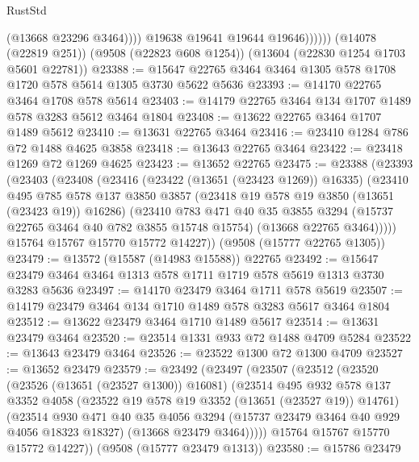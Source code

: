 \begin{lexlean}{RustStd}
\begin{coremodule}
                      (@13668 @23296 @3464))))
                @19638
                @19641
                @19644
                @19646))))))
    (@14078 (@22819 @251))
    (@9508 (@22823 @608 @1254))
    (@13604 (@22830 @1254 @1703 @5601 @22781))
@23388 := @15647 @22765 @3464 @3464 @1305 @578 @1708 @1720 @578 @5614 @1305 @3730 @5622 @5636
@23393 := @14170 @22765 @3464 @1708 @578 @5614
@23403 := @14179 @22765 @3464 @134 @1707 @1489 @578 @3283 @5612 @3464 @1804
@23408 := @13622 @22765 @3464 @1707 @1489 @5612
@23410 := @13631 @22765 @3464
@23416 := @23410 @1284 @786 @72 @1488 @4625 @3858
@23418 := @13643 @22765 @3464
@23422 := @23418 @1269 @72 @1269 @4625
@23423 := @13652 @22765
@23475 := @23388
    (@23393
      (@23403
        (@23408
          (@23416
            (@23422 (@13651 (@23423 @1269)) @16335)
            (@23410
              @495
              @785
              @578
              @137
              @3850
              @3857
              (@23418 @19 @578 @19 @3850 (@13651 (@23423 @19)) @16286)
              (@23410
                @783
                @471
                @40
                @35
                @3855
                @3294
                (@15737 @22765 @3464 @40 @782 @3855 @15748 @15754)
                (@13668 @22765 @3464)))))
        @15764
        @15767
        @15770
        @15772
        @14227))
    (@9508 (@15777 @22765 @1305))
@23479 := @13572 (@15587 (@14983 @15588)) @22765
@23492 := @15647 @23479 @3464 @3464 @1313 @578 @1711 @1719 @578 @5619 @1313 @3730 @3283 @5636
@23497 := @14170 @23479 @3464 @1711 @578 @5619
@23507 := @14179 @23479 @3464 @134 @1710 @1489 @578 @3283 @5617 @3464 @1804
@23512 := @13622 @23479 @3464 @1710 @1489 @5617
@23514 := @13631 @23479 @3464
@23520 := @23514 @1331 @933 @72 @1488 @4709 @5284
@23522 := @13643 @23479 @3464
@23526 := @23522 @1300 @72 @1300 @4709
@23527 := @13652 @23479
@23579 := @23492
    (@23497
      (@23507
        (@23512
          (@23520
            (@23526 (@13651 (@23527 @1300)) @16081)
            (@23514
              @495
              @932
              @578
              @137
              @3352
              @4058
              (@23522 @19 @578 @19 @3352 (@13651 (@23527 @19)) @14761)
              (@23514
                @930
                @471
                @40
                @35
                @4056
                @3294
                (@15737 @23479 @3464 @40 @929 @4056 @18323 @18327)
                (@13668 @23479 @3464)))))
        @15764
        @15767
        @15770
        @15772
        @14227))
    (@9508 (@15777 @23479 @1313))
@23580 := @15786 @23479

\end{coremodule}
\end{lexlean}
